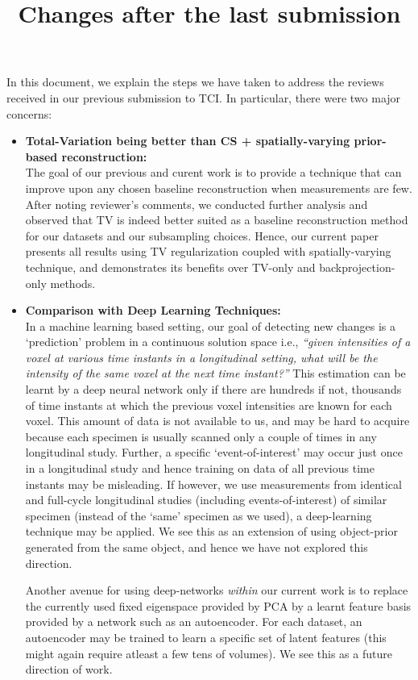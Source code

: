 \documentclass{article}
\title{Changes after the last submission}
\begin{document}
\maketitle
In this document, we explain the steps we have taken to address the reviews received in our previous submission to TCI. In particular, there were two major concerns:

\begin{itemize}
\item \textbf{Total-Variation being better than CS + spatially-varying prior-based reconstruction:}\\

  The goal of our previous and curent work is to provide a technique that can improve upon any chosen baseline reconstruction when measurements are few. After noting reviewer's comments, we conducted further analysis and observed that TV is indeed better suited as a baseline reconstruction method for our datasets and our subsampling choices. Hence, our current paper presents all results using TV regularization coupled with spatially-varying technique, and demonstrates its benefits over TV-only and backprojection-only methods.

\item \textbf{Comparison with Deep Learning Techniques:}\\
  
  In a machine learning based setting, our goal of detecting new changes is a `prediction' problem in a continuous solution space i.e., \textit{``given intensities of a voxel at various time instants in a longitudinal setting, what will be the intensity of the same voxel at the next time instant?''} This estimation can be learnt by a deep neural network only if there are hundreds if not, thousands of time instants at which the previous voxel intensities are known for each voxel. This amount of data is not available to us, and may be hard to acquire because each specimen is usually scanned only a couple of times in any longitudinal study. Further, a specific `event-of-interest' may occur just once in a longitudinal study and hence training on data of all previous time instants may be misleading. If however, we use measurements from identical and full-cycle longitudinal studies (including events-of-interest) of similar specimen (instead of the `same' specimen as we used), a deep-learning technique may be applied. We see this as an extension of using object-prior generated from the same object, and hence we have not explored this direction.

  Another avenue for using deep-networks \textit{within} our current work is to replace the currently used fixed eigenspace provided by PCA by a learnt feature basis provided by a network such as an autoencoder. For each dataset, an autoencoder may be trained to learn a specific set of latent features (this might again require atleast a few tens of volumes). We see this as a future direction of work. 

  
  
\end{itemize}
\end{document}
